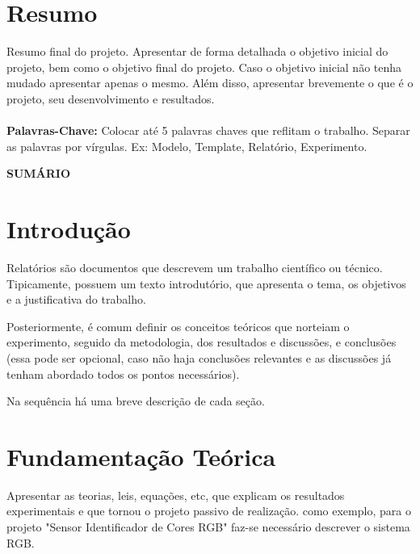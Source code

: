 \documentclass[a4paper,12pt]{article}
\begin{document}
\section*{Resumo}
\label{sec:resumo}
Resumo final do projeto. Apresentar de forma detalhada o objetivo inicial do projeto, bem como o objetivo final do projeto. Caso o objetivo inicial não tenha mudado apresentar apenas o mesmo. Além disso, apresentar brevemente o que é o projeto, seu desenvolvimento e resultados. \\ \\

\textbf{Palavras-Chave: }Colocar até 5 palavras chaves que reflitam o trabalho. Separar as palavras por vírgulas.
Ex: Modelo, Template, Relatório, Experimento.

\newpage
\begin{center}
    {\LARGE \textbf{SUMÁRIO}} %
\end{center}
\vspace{1cm}

\begingroup
    \hypersetup{hidelinks}
    \renewcommand{\contentsname}{} %
    \tableofcontents
\endgroup


\newpage
\section{Introdução}
\label{sec:introd}
Relatórios são documentos que descrevem um trabalho científico ou técnico. Tipicamente, possuem um
texto introdutório, que apresenta o tema, os objetivos e a justificativa do trabalho. 

Posteriormente, é comum definir os conceitos teóricos que norteiam o experimento, seguido da metodologia, dos resultados e discussões, e conclusões (essa pode ser opcional, caso não haja conclusões relevantes e as discussões já tenham abordado todos os pontos necessários).

Na sequência há uma breve descrição de cada seção.

\newpage
\section{Fundamentação Teórica}
\label{sec:teoria}
Apresentar as teorias, leis, equações, etc, que explicam os  resultados  experimentais e que tornou o projeto passivo de realização. como exemplo, para o projeto "Sensor Identificador de Cores RGB" faz-se necessário descrever o sistema RGB. 
\end{document}
